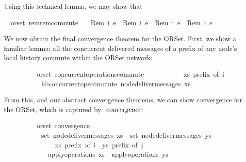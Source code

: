 Using this technical lemma, we may show that 
\begin{isabellebody}
\isamarkupfalse%
\ {\isacharparenleft}\ orset{\isacharparenright}\ rem{\isacharunderscore}rem{\isacharunderscore}commute{\isacharcolon}\isanewline
\ \ \ {\isachardoublequoteopen}{\isasymlangle}Rem\ i{}\ e{}{\isasymrangle}\ {\isasymrhd}\ {\isasymlangle}Rem\ i{}\ e{}{\isasymrangle}\ {\isacharequal}\ {\isasymlangle}Rem\ i{}\ e{}{\isasymrangle}\ {\isasymrhd}\ {\isasymlangle}Rem\ i{}\ e{}{\isasymrangle}{\isachardoublequoteclose}\isanewline
\end{isabellebody}
We now obtain the final convergence theorem for the ORSet.
First, we show a familiar lemma: all the concurrent delivered messages of a prefix of any node's local history commute within the ORSet network:
\vspace{0.375em}
\begin{isabellebody}
\ \ \ \ \ \ \ \  {\isacharparenleft}\ orset{\isacharparenright}\ concurrent{\isacharunderscore}operations{\isacharunderscore}commute{\isacharcolon}\isanewline
\ \ \ \ \ \ \ \ \ \ \ {\isachardoublequoteopen}xs\ prefix\ of\ i{\isachardoublequoteclose}\isanewline
\ \ \ \ \ \ \ \ \ \ \ {\isachardoublequoteopen}hb{\isachardot}concurrent{\isacharunderscore}ops{\isacharunderscore}commute\ {\isacharparenleft}node{\isacharunderscore}deliver{\isacharunderscore}messages\ xs{\isacharparenright}{\isachardoublequoteclose}
\end{isabellebody}
\vspace{0.375em}
From this, and our abstract convergence theorems, we can show convergence for the ORSet, which is captured by $\isa{convergence}$:
\vspace{0.375em}
\begin{isabellebody}
\ \ \ \ \ \ \ \  {\isacharparenleft}\ orset{\isacharparenright}\ convergence{\isacharcolon}\isanewline
\ \ \ \ \ \ \ \ \ \ \ {\isachardoublequoteopen}set\ {\isacharparenleft}node{\isacharunderscore}deliver{\isacharunderscore}messages\ xs{\isacharparenright}\ {\isacharequal}\ set\ {\isacharparenleft}node{\isacharunderscore}deliver{\isacharunderscore}messages\ ys{\isacharparenright}{\isachardoublequoteclose}\isanewline
\ \ \ \ \ \ \ \ \ \ \ \ \ \ \ {\isachardoublequoteopen}xs\ prefix\ of\ i{\isachardoublequoteclose}\ \ {\isachardoublequoteopen}ys\ prefix\ of\ j{\isachardoublequoteclose}\isanewline
\ \ \ \ \ \ \ \ \ \ \ \ \ {\isachardoublequoteopen}apply{\isacharunderscore}operations\ xs\ {\isacharequal}\ apply{\isacharunderscore}operations\ ys{\isachardoublequoteclose}
\end{isabellebody}